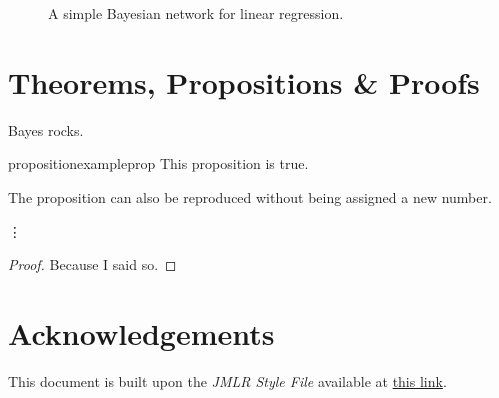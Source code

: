 \documentclass{article}
\begin{document}
\begin{figure}[!ht]
    \centering
{}
    \caption{A simple Bayesian network for linear regression.}
    \label{fig:bayes_net}
\end{figure}

\section{Theorems, Propositions \& Proofs}

\begin{axiom}
Bayes rocks.
\end{axiom}


\begin{restatable}[]{proposition}{exampleprop} \label{prop:exampleprop}
This proposition is true.
\end{restatable}

The proposition can also be reproduced without being assigned a new number.

\vdots

\exampleprop*
\begin{proof}
Because I said so.	
\end{proof}

\section*{Acknowledgements}

This document is built upon the \emph{JMLR Style File} available at \href{https://github.com/JmlrOrg/jmlr-style-file}{this link}.


\end{document}
